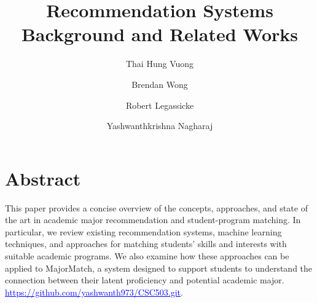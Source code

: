 \documentclass[sigconf]{acmart}
\begin{document}

\title{Recommendation Systems Background and Related Works}


\author{Thai Hung Vuong}

\author{Brendan Wong}

\author{Robert Legassicke}

\author{Yashwanthkrishna Nagharaj}


\maketitle


\section*{Abstract}

This paper provides a concise overview of the concepts, approaches, and state of the art in academic major recommendation and student-program matching. In particular, we review existing recommendation systems, machine learning techniques, and approaches for matching students' skills and interests with suitable academic programs. We also examine how these approaches can be applied to MajorMatch, a system designed to support students to understand the connection between their latent proficiency and potential academic major. \href{https://github.com/yashwanth973/CSC503.git}
{\textcolor{blue}{\underline{https://github.com/yashwanth973/CSC503.git}}}.

\setcounter{section}{1}
\setcounter{subsection}{0}
\end{document}

